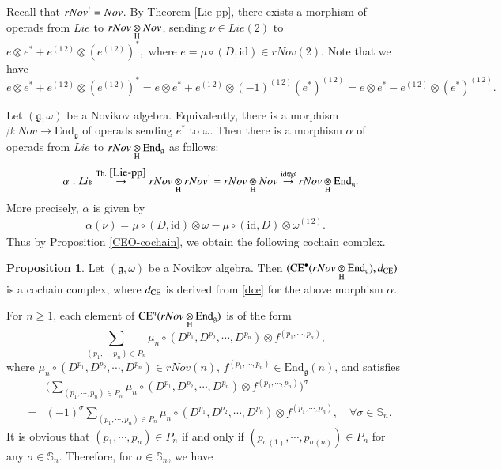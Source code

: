 \documentclass[12pt]{amsart}
\theoremstyle{definition}
\newtheorem{pro}[thm]{Proposition}
\newcommand{\g}{\mathfrak g}
\newcommand{\id}{\mathrm{id}}
\newcommand{\End}{\mathrm{End}}
\newcommand{\ot}{\otimes}
\newcommand{\s}{\mathbb{S}}
\newcommand{\ceo}{{\rm CE}^{\bullet}}
\newcommand{\ce}{{\rm CE}}
\begin{document}
Recall that $rNov^{\textup{!}}=Nov$.  By Theorem \ref{Lie-pp}, there exists a morphism of operads from $Lie$ to $rNov\underset{\rm H}{\ot} Nov$, sending $\nu\in Lie(2)$ to
$
e\ot e^*+e^{(1\,2)}\ot (e^{(1\,2)})^*,
$
where $e=\mu\circ(D,\id)\in rNov(2)$. Note that we have
$$
e\ot e^*+e^{(1\,2)}\ot (e^{(1\,2)})^* =e\ot e^*+e^{(1\,2)}\ot (-1)^{(1\,2)}(e^*)^{(1\,2)}=e\ot e^*-e^{(1\,2)}\ot (e^*)^{(1\,2)}.
$$

Let $(\g,\omega)$ be a Novikov algebra. Equivalently, there is a morphism $\beta:Nov\to \End_\g$ of operads sending $e^*$ to $\omega$. Then there is a morphism $\alpha$ of operads from $Lie$ to $rNov\underset{\rm H}{\ot}\End_\g$ as follows:
\begin{eqnarray}\label{Lie-to-rNov-Endg}
&&\alpha:Lie\overset{{\rm Th.}~ \ref{Lie-pp}}{\to} rNov\underset{\rm H}{\ot} rNov^!=rNov\underset{\rm H}{\ot} Nov\overset{\id\ot\beta}{\to}rNov\underset{\rm H}{\ot}\End_\g.
\end{eqnarray}
More precisely, $\alpha$ is given by
\begin{align*}
\alpha(\nu)=\mu\circ(D,\id) \ot \omega-\mu\circ(\id,D)\ot \omega^{(1\,2)}.
\end{align*}
 Thus by Proposition \ref{CEO-cochain}, we obtain the following cochain complex.
\begin{pro}\label{CE-rNov-Endg}
Let $(\g,\omega)$ be a Novikov algebra. Then $(\ceo(rNov\underset{\rm H}{\ot}\End_\g),d_{\rm CE})$ is a cochain complex, where $d_{\rm CE}$ is derived from \eqref{dce} for the above morphism $\alpha$.
\end{pro}
For $n\geqslant 1$, each element of
$\ce^n(rNov\underset{\rm H}{\ot}\End_\g)$ is of the form
$$
\sum\limits_{(p_1,\cdots,p_n)\in P_n} \mu_n\circ(D^{p_1}, D^{p_2},\cdots,D^{p_n})\otimes f^{(p_1,\cdots,p_n)},
$$
where $\mu_n\circ(D^{p_1}, D^{p_2},\cdots,D^{p_n})\in   rNov(n)$, $f^{(p_1,\cdots,p_n)}\in\End_\g(n)$, and satisfies
\begin{eqnarray}\label{CEn-element}
&&\Bigg(\sum_{(p_1,\cdots,p_n)\in P_n} \mu_n\circ(D^{p_1},D^{p_2},\cdots,D^{p_n})\otimes f^{(p_1,\cdots,p_n)}\Bigg)^\sigma\\
&=&(-1)^\sigma\sum_{(p_1,\cdots,p_n)\in P_n} \mu_n\circ(D^{p_1},D^{p_2},\cdots,D^{p_n} )\otimes f^{(p_1,\cdots,p_n)},\nonumber\quad \forall \sigma\in\mathbb{S}_n.
\end{eqnarray}
It is obvious that $(p_1,\cdots,p_n)\in P_n$ if and only if $(p_{\sigma(1)},\cdots,p_{\sigma(n)})\in P_n$ for any $\sigma\in \mathbb{S}_n$. Therefore, for  $\sigma\in\s_n$, we have
\end{document}

